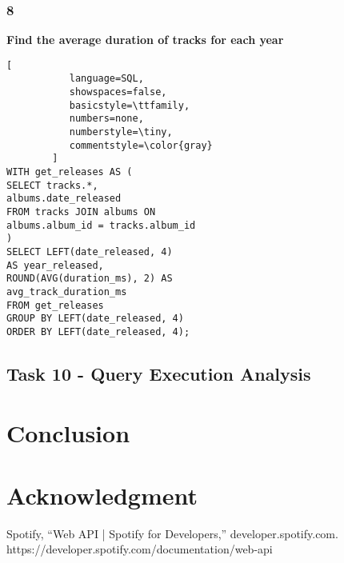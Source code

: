 \documentclass[conference]{IEEEtran}
\begin{document}
\subsubsection*{8} \textbf{Find the average duration of tracks for each year}

\begin{lstlisting}[
           language=SQL,
           showspaces=false,
           basicstyle=\ttfamily,
           numbers=none,
           numberstyle=\tiny,
           commentstyle=\color{gray}
        ]
WITH get_releases AS (
SELECT tracks.*,
albums.date_released
FROM tracks JOIN albums ON 
albums.album_id = tracks.album_id
)
SELECT LEFT(date_released, 4) 
AS year_released, 
ROUND(AVG(duration_ms), 2) AS 
avg_track_duration_ms
FROM get_releases
GROUP BY LEFT(date_released, 4)
ORDER BY LEFT(date_released, 4);
\end{lstlisting}

\subsection{\textbf{Task 10} - Query Execution Analysis}

\section{Conclusion}



\section*{Acknowledgment}


\begin{thebibliography}{00}
Spotify, “Web API | Spotify for Developers,” developer.spotify.com. https://developer.spotify.com/documentation/web-api

\end{thebibliography}
\end{document}
